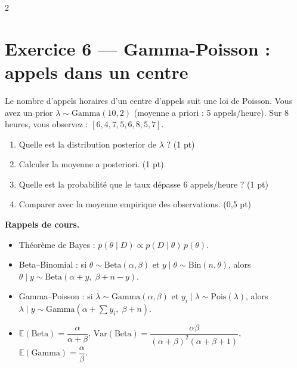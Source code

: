 \documentclass[9pt]{extarticle}
\begin{document}
\begin{multicols}{2}
\section*{Exercice 6 --- Gamma-Poisson : appels dans un centre}

Le nombre d'appels horaires d'un centre d'appels suit une loi de Poisson. Vous avez un prior $\lambda \sim \mathrm{Gamma}(10, 2)$ (moyenne a priori : 5 appels/heure). Sur 8 heures, vous observez : $[6, 4, 7, 5, 6, 8, 5, 7]$.

\begin{enumerate}[label=\alph*)]
  \item Quelle est la distribution posterior de $\lambda$ ? \hfill (1 pt)
  \item Calculer la moyenne a posteriori. \hfill (1 pt)
  \item Quelle est la probabilité que le taux dépasse 6 appels/heure ? \hfill (1 pt)
  \item Comparer avec la moyenne empirique des observations. \hfill (0,5 pt)
\end{enumerate}

\begin{donnees}
{\scriptsize\textbf{Rappels de cours.}}
\begin{itemize}[leftmargin=4mm, itemsep=0pt]
  \item \small Théorème de Bayes : $p(\theta \mid D) \propto p(D \mid \theta)\, p(\theta)$.
  \item \small Beta--Binomial : si $\theta \sim \mathrm{Beta}(\alpha, \beta)$ et $y \mid \theta \sim \mathrm{Bin}(n, \theta)$, alors $\theta \mid y \sim \mathrm{Beta}(\alpha + y,\; \beta + n - y)$.
  \item \small Gamma--Poisson : si $\lambda \sim \mathrm{Gamma}(\alpha, \beta)$ et $y_i \mid \lambda \sim \mathrm{Pois}(\lambda)$, alors $\lambda \mid y \sim \mathrm{Gamma}(\alpha + \sum y_i,\; \beta + n)$.
  \item \small $\mathbb{E}(\mathrm{Beta}) = \dfrac{\alpha}{\alpha + \beta}$, \qquad
        $\mathrm{Var}(\mathrm{Beta}) = \dfrac{\alpha\beta}{(\alpha+\beta)^2 (\alpha+\beta+1)}$, \qquad
        $\mathbb{E}(\mathrm{Gamma}) = \dfrac{\alpha}{\beta}$.
\end{itemize}
\end{donnees}
\end{multicols}
\end{document}
